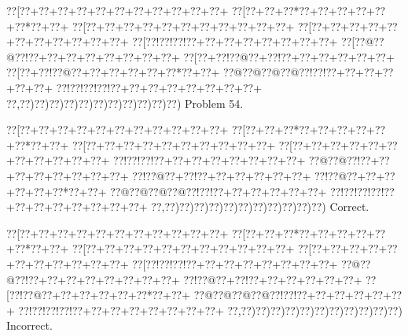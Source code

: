 \documentclass[a5paper]{article}
\begin{document}
\newpage
\begin{center}
{\goo
\0??[\0??+\0??+\0??+\0??+\0??+\0??+\0??+\0??+\0??+\0??+\0??+
\0??[\0??+\0??+\0??*\0??+\0??+\0??+\0??+\0??+\0??*\0??+\0??+
\0??[\0??+\0??+\0??+\0??+\0??+\0??+\0??+\0??+\0??+\0??+\0??+
\0??[\0??+\0??+\0??+\0??+\0??+\0??+\0??+\0??+\0??+\0??+\0??+
\0??[\0??!\0??!\0??!\0??+\0??+\0??+\0??+\0??+\0??+\0??+\0??+
\0??[\0??@\0??@\0??!\0??+\0??+\0??+\0??+\0??+\0??+\0??+\0??+
\0??[\0??+\0??!\0??@\0??+\0??!\0??+\0??+\0??+\0??+\0??+\0??+
\0??[\0??+\0??!\0??@\0??+\0??+\0??+\0??+\0??+\0??*\0??+\0??+
\0??@\0??@\0??@\0??@\0??!\0??!\0??+\0??+\0??+\0??+\0??+\0??+
\0??!\0??!\0??!\0??!\0??+\0??+\0??+\0??+\0??+\0??+\0??+\0??+
\0??,\0??)\0??)\0??)\0??)\0??)\0??)\0??)\0??)\0??)\0??)\0??)
}
Problem 54.

\end{center}
\begin{center}
{\goo
\0??[\0??+\0??+\0??+\0??+\0??+\0??+\0??+\0??+\0??+\0??+\0??+
\0??[\0??+\0??+\0??*\0??+\0??+\0??+\0??+\0??+\0??*\0??+\0??+
\0??[\0??+\0??+\0??+\0??+\0??+\0??+\0??+\0??+\0??+\0??+
\0??[\0??+\0??+\0??+\0??+\0??+\0??+\0??+\0??+\0??+\0??+\0??+
\0??!\0??!\0??!\0??+\0??+\0??+\0??+\0??+\0??+\0??+\0??+
\0??@\0??@\0??!\0??+\0??+\0??+\0??+\0??+\0??+\0??+\0??+
\0??!\0??@\0??+\0??!\0??+\0??+\0??+\0??+\0??+\0??+
\0??!\0??@\0??+\0??+\0??+\0??+\0??+\0??*\0??+\0??+
\0??@\0??@\0??@\0??@\0??!\0??!\0??+\0??+\0??+\0??+\0??+\0??+
\0??!\0??!\0??!\0??!\0??+\0??+\0??+\0??+\0??+\0??+\0??+\0??+
\0??,\0??)\0??)\0??)\0??)\0??)\0??)\0??)\0??)\0??)\0??)\0??)
}
Correct. 

\end{center}
\begin{center}
{\goo
\0??[\0??+\0??+\0??+\0??+\0??+\0??+\0??+\0??+\0??+\0??+\0??+
\0??[\0??+\0??+\0??*\0??+\0??+\0??+\0??+\0??+\0??*\0??+\0??+
\0??[\0??+\0??+\0??+\0??+\0??+\0??+\0??+\0??+\0??+\0??+\0??+
\0??[\0??+\0??+\0??+\0??+\0??+\0??+\0??+\0??+\0??+\0??+\0??+
\0??[\0??!\0??!\0??!\0??+\0??+\0??+\0??+\0??+\0??+\0??+\0??+
\0??@\0??@\0??!\0??+\0??+\0??+\0??+\0??+\0??+\0??+\0??+
\0??!\0??@\0??+\0??!\0??+\0??+\0??+\0??+\0??+\0??+
\0??[\0??!\0??@\0??+\0??+\0??+\0??+\0??+\0??*\0??+\0??+
\0??@\0??@\0??@\0??@\0??!\0??!\0??+\0??+\0??+\0??+\0??+\0??+
\0??!\0??!\0??!\0??!\0??+\0??+\0??+\0??+\0??+\0??+\0??+\0??+
\0??,\0??)\0??)\0??)\0??)\0??)\0??)\0??)\0??)\0??)\0??)\0??)
}
Incorrect. 

\end{center}
\newpage
\end{document}
